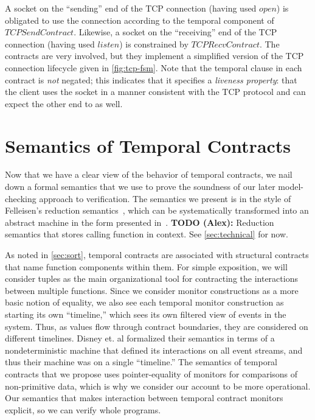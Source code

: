 \documentclass[preprint,onecolumn,9pt]{sigplanconf} %
\begin{document}
A socket on the ``sending'' end of the TCP connection (having used $open$) is obligated to use the connection according to the temporal component of $TCPSendContract$.
%
Likewise, a socket on the ``receiving'' end of the TCP connection (having used $listen$) is constrained by $TCPRecvContract$.
%
The contracts are very involved, but they implement a simplified version of the TCP connection lifecycle given in \autoref{fig:tcp-fsm}.
%
Note that the temporal clause in each contract is \emph{not} negated; this indicates that it specifies a \emph{liveness property}: that the client uses the socket in a manner consistent with the TCP protocol and can expect the other end to as well.

\section{Semantics of Temporal Contracts}

Now that we have a clear view of the behavior of temporal contracts, we nail down a formal semantics that we use to prove the soundness of our later model-checking approach to verification.
%
The semantics we present is in the style of Felleisen's reduction semantics~\citep{ianjohnson:Felleisen:2009:SEP:1795772}, which can be systematically transformed into an abstract machine in the form presented in~\citet{dvanhorn:VanHorn2010Abstracting}.
%
{\bf TODO (Alex):} Reduction semantics that stores calling function in context.
%
See \autoref{sec:technical} for now.

As noted in \autoref{sec:sort}, temporal contracts are associated with structural contracts that name function components within them.
%
For simple exposition, we will consider tuples as the main organizational tool for contracting the interactions between multiple functions.
%
Since we consider monitor constructions as a more basic notion of equality, we also see each temporal monitor construction as starting its own ``timeline,'' which sees its own filtered view of events in the system.
%
Thus, as values flow through contract boundaries, they are considered on different timelines.
%
Disney et. al formalized their semantics in terms of a nondeterministic machine that defined its interactions on all event streams, and thus their machine was on a single ``timeline.''
%
The semantics of temporal contracts that we propose uses pointer-equality of monitors for comparisons of non-primitive data, which is why we consider our account to be more operational.
%
Our semantics that makes interaction between temporal contract monitors explicit, so we can verify whole programs.
\end{document}

